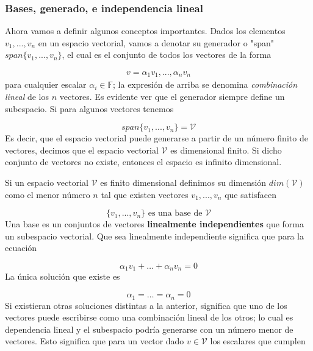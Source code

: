 \subsubsection{Bases, generado, e independencia lineal}

Ahora vamos a definir algunos conceptos importantes. Dados los elementos $v_1,...,v_n$ en un espacio vectorial, vamos a denotar su generador o "span" $span\{ v_1,...,v_n \}$, el cual es el conjunto de todos los vectores de la forma 

\begin{eqnarray*}
v=\alpha_1 v_1, ... , \alpha_n v_n
\end{eqnarray*}
para cualquier escalar $\alpha_i \in \mathbb{F}$;  la expresión de arriba se denomina \textit{combinación lineal} de los $n$ vectores. Es evidente ver que el generador siempre define un subespacio. Si para algunos vectores tenemos 

\begin{equation*}
span\{ v_1,...,v_n \} = \mathcal{V}
\end{equation*}
Es decir, que el espacio vectorial puede generarse a partir de un número finito de vectores, decimos que el espacio vectorial $\mathcal{V}$ es dimensional finito. Si dicho conjunto de vectores no existe, entonces el espacio es infinito dimensional.

Si un espacio vectorial $\mathcal{V}$ es finito dimensional definimos su dimensión $dim(\mathcal{V})$ como el menor número $n$ tal que existen vectores $v_1,...,v_n$ que satisfacen

\begin{equation*}
 \{v_1,...,v_n \} \text{ es una base de  } \mathcal{V}
\end{equation*}
Una base es un conjuntos de vectores \textbf{linealmente independientes} que forma un subespacio vectorial. Que sea linealmente independiente significa que para la ecuación

\begin{equation*}
\alpha_1 v_1 + \dots + \alpha_n v_n =0
\end{equation*}
La única solución que existe es 

\begin{equation*}
\alpha_1 = \dots = \alpha_n = 0  
\end{equation*}
Si existieran otras soluciones distintas a la anterior, significa que uno de los vectores puede escribirse como una combinación lineal de los otros; lo cual es dependencia lineal y el subespacio podría generarse con un número menor de vectores. Esto significa que para un vector dado $v \in \mathcal{V}$ los escalares que cumplen 


